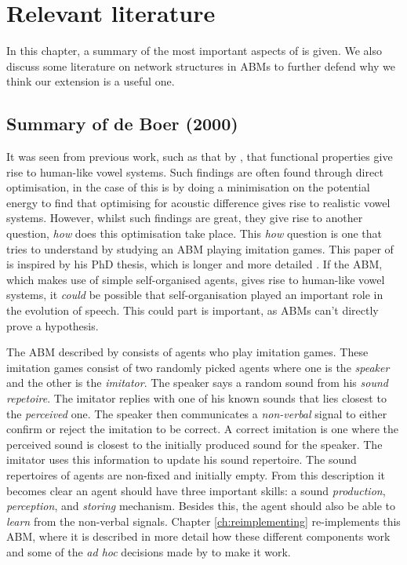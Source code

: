 \chapter{Relevant literature}
\label{ch:literature}

In this chapter, a summary of the most important aspects of \citet{deBoer2000} is given.
We also discuss some literature on network structures in ABMs to further defend why we think our extension is a useful one.


\section{Summary of de Boer (2000)}
\label{sec:literature_db2000}

It was seen from previous work, such as that by \citet{landl}, that functional properties give rise to human-like vowel systems.
Such findings are often found through direct optimisation, in the case of \citep{landl} this is by doing a minimisation on the potential energy to find that optimising for acoustic difference gives rise to realistic vowel systems.
However, whilst such findings are great, they give rise to another question, \textit{how} does this optimisation take place.
This \textit{how} question is one that \citep{deBoer2000} tries to understand by studying an ABM playing imitation games.
This paper of \citet{deBoer2000} is inspired by his PhD thesis, which is longer and more detailed \citep{deBoerFull}.
If the ABM, which makes use of simple self-organised agents, gives rise to human-like vowel systems, it \textit{could} be possible that self-organisation played an important role in the evolution of speech.
This could part is important, as ABMs can't directly prove a hypothesis.

The ABM described by \citet{deBoer2000} consists of agents who play imitation games.
These imitation games consist of two randomly picked agents where one is the \textit{speaker} and the other is the \textit{imitator}.
The speaker says a random sound from his \textit{sound repetoire}.
The imitator replies with one of his known sounds that lies closest to the \textit{perceived} one.
The speaker then communicates a \textit{non-verbal} signal to either confirm or reject the imitation to be correct.
A correct imitation is one where the perceived sound is closest to the initially produced sound for the speaker.
The imitator uses this information to update his sound repertoire.
The sound repertoires of agents are non-fixed and initially empty.
From this description it becomes clear an agent should have three important skills: a sound \textit{production}, \textit{perception}, and \textit{storing} mechanism.
Besides this, the agent should also be able to \textit{learn} from the non-verbal signals.
Chapter \ref{ch:reimplementing} re-implements this ABM, where it is described in more detail how these different components work and some of the \textit{ad hoc} decisions made by \citet{deBoer2000} to make it work.

